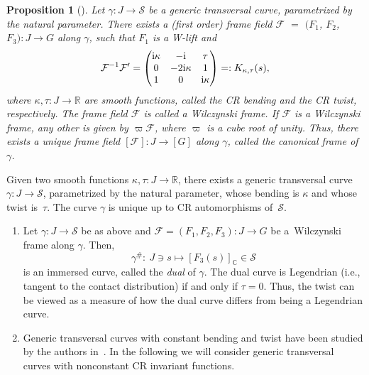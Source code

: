 \documentclass[pdftex]{sigma}
\numberwithin{equation}{section}
\newtheorem{Proposition}[Theorem]{Proposition}
 { \theoremstyle{definition}
\newtheorem{Definition}[Theorem]{Definition}
\newtheorem{Note}[Theorem]{Note}
\newtheorem{Example}[Theorem]{Example}
\newtheorem{Remark}[Theorem]{Remark} }
\def\C{\mathbb{C}}
\def\R{\mathbb{R}}
\def\S{\mathcal{S}}
\def\F{\mathcal{F}}
\def\S{\mathcal{S}}
\begin{document}
\begin{Proposition}[\cite{MNS-Kharkiv}]\label{Prop-CF}
Let $\gamma \colon J \to\S$ be a generic transversal curve, pa\-ra\-me\-tri\-zed by the natural parameter. There exists a
(first order) frame field
$\F$ $=$ $(F_1$, $F_2$, $F_3) \colon J \to {G}$ along $\gamma$,
such that $F_1$ is a W-lift and
\begin{equation}\label{MCE-W-frame}
\F^{-1}\F'=
\begin{pmatrix}
{\rm i}\kappa & -{\rm i} & \tau\\
0 &-2{\rm i}\kappa & 1 \\
1 & 0&{\rm i}\kappa\\
 \end{pmatrix}
 = : K_{\kappa,\tau}(s),
 \end{equation}
where $\kappa, \tau \colon J \to \mathbb R$ are smooth functions, called the
\emph{CR bending}
and the \emph{CR twist}, respectively.
 The frame field $\F$ is called a {\em Wilczynski frame}.
If $\F$ is a Wilczynski frame, any other is given by $\varpi\F$,
where $\varpi$ is a cube root of unity.
Thus, there exists a unique frame
field $[\mathcal{F}] \colon J \to [G]$ along $\gamma$, called the {\em canonical frame} of $\gamma$.
\end{Proposition}

\begin{Remark}
Given two smooth functions $\kappa, \tau\colon J\to\R$, there exists a generic transversal
curve $\gamma\colon J\to\S$,
parametrized by the natural parameter,
whose bending is $\kappa$ and whose twist is~$\tau$.
The curve $\gamma$ is unique up to CR automorphisms of~$\S$.
\end{Remark}

\begin{Remark}\quad
\begin{enumerate}\itemsep=0pt
\item[$(1)$] Let $\gamma \colon J \to\S $ be as above and $\F = (F_1, F_2, F_3)\colon J \to {G}$ be a~Wilczynski frame
along $\gamma$. Then,
\[
 \gamma^\# \colon \ J \ni s\mapsto [F_3(s)]_\C\in\S
\]
is an immersed curve, called the \emph{dual} of $\gamma$.
The dual curve is Legendrian (i.e., tangent to the contact distribution)
if and only if $\tau = 0$. Thus, the twist can be viewed as a measure of how the dual curve differs
from being a Legendrian curve.

\item[$(2)$] Generic transversal curves with constant bending and twist have been studied by the authors in~\cite{MNS-Kharkiv}.
In the following we will consider generic transversal curves with nonconstant CR invariant functions.
\end{enumerate}
\end{Remark}
\end{document}
